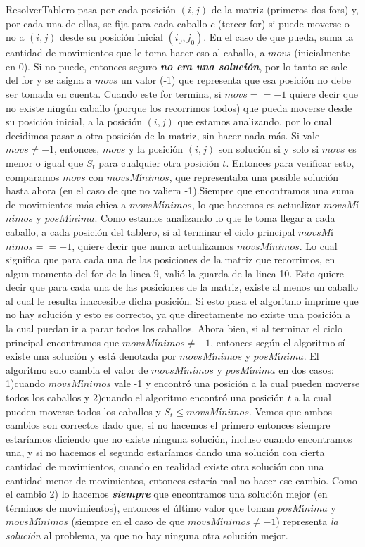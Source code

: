 \documentclass[a4paper]{article}
\begin{document}
\newline ResolverTablero pasa por cada posición $(i, j)$ de la matriz (primeros dos fors) y, por cada una de ellas, se fija para cada caballo $c$ (tercer for) si puede moverse o no a $(i, j)$ desde su posición inicial $(i_0, j_0)$. En el caso de que pueda, suma la cantidad de movimientos que le toma hacer eso al caballo, a $movs$ (inicialmente en 0). Si no puede, entonces seguro \textit{\textbf{no era una solución}}, por lo tanto se sale del for y se asigna a $movs$ un valor (-1) que representa que esa posición no debe ser tomada en cuenta. Cuando este for termina, si $movs == -1$ quiere decir que no existe ningún caballo (porque los recorrimos todos) que pueda moverse desde su posición inicial, a la posición $(i, j)$ que estamos analizando, por lo cual decidimos pasar a otra posición de la matriz, sin hacer nada más. Si vale $movs \neq -1$, entonces, $movs$ y la posición $(i, j)$ son solución si y solo si $movs$ es menor o igual que $S_t$ para cualquier otra posición $t$. Entonces para verificar esto, comparamos $movs$ con $movsM$í$nimos$, que representaba una posible solución hasta ahora (en el caso de que no valiera -1).Siempre que encontramos una suma de movimientos más chica a $movsM$í$nimos$, lo que hacemos es actualizar $movsM$í$nimos$ y $posM$í$nima$. Como estamos analizando lo que le toma llegar a cada caballo, a cada posición del tablero, si al terminar el ciclo principal $movsM$í$nimos == -1$, quiere decir que nunca actualizamos $movsM$í$nimos$. Lo cual significa que para cada una de las posiciones de la matriz que recorrimos, en algun momento del for de la linea 9, valió la guarda de la linea 10. Esto quiere decir que para cada una de las posiciones de la matriz, existe al menos un caballo al cual le resulta inaccesible dicha posición. Si esto pasa el algoritmo imprime que no hay solución y esto es correcto, ya que directamente no existe una posición a la cual puedan ir a parar todos los caballos.
\newline Ahora bien, si al terminar el ciclo principal encontramos que $movsM$í$nimos \neq -1$, entonces según el algoritmo sí existe una solución y está denotada por $movsM$í$nimos$ y $posM$í$nima$. El algoritmo solo cambia el valor de $movsM$í$nimos$ y $posM$í$nima$ en dos casos: 1)cuando $movsM$í$nimos$ vale -1 y encontró una posición a la cual pueden moverse todos los caballos y 2)cuando el algoritmo encontró una posición $t$ a la cual pueden moverse todos los caballos y $S_t \le movsM$í$nimos$. Vemos que ambos cambios son correctos dado que, si no hacemos el primero entonces siempre estaríamos diciendo que no existe ninguna solución, incluso cuando encontramos una, y si no hacemos el segundo estaríamos dando una solución con cierta cantidad de movimientos, cuando en realidad existe otra solución con una cantidad menor de movimientos, entonces estaría mal no hacer ese cambio. Como el cambio 2) lo hacemos \textit{\textbf{siempre}} que encontramos una solución mejor (en términos de movimientos), entonces el último valor que toman $posM$í$nima$ y $movsM$í$nimos$ (siempre en el caso de que $movsM$í$nimos \neq -1$) representa \textit{la solución} al problema, ya que no hay ninguna otra solución mejor.
\end{document}
